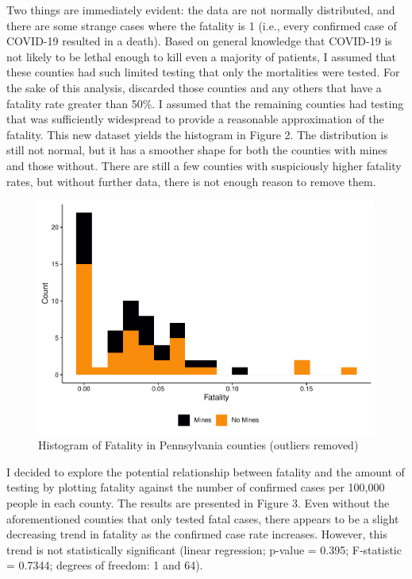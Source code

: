 \documentclass[
  12pt,
]{article}
\begin{document}
Two things are immediately evident: the data are not normally
distributed, and there are some strange cases where the fatality is 1
(i.e., every confirmed case of COVID-19 resulted in a death). Based on
general knowledge that COVID-19 is not likely to be lethal enough to
kill even a majority of patients, I assumed that these counties had such
limited testing that only the mortalities were tested. For the sake of
this analysis, discarded those counties and any others that have a
fatality rate greater than 50\%. I assumed that the remaining counties
had testing that was sufficiently widespread to provide a reasonable
approximation of the fatality. This new dataset yields the histogram in
Figure 2. The distribution is still not normal, but it has a smoother
shape for both the counties with mines and those without. There are
still a few counties with suspiciously higher fatality rates, but
without further data, there is not enough reason to remove them.

\begin{figure}
\centering
\includegraphics{Hancock_ENV872_Project_files/figure-latex/PA Histogram2-1.pdf}
\caption{Histogram of Fatality in Pennsylvania counties (outliers
removed)}
\end{figure}

I decided to explore the potential relationship between fatality and the
amount of testing by plotting fatality against the number of confirmed
cases per 100,000 people in each county. The results are presented in
Figure 3. Even without the aforementioned counties that only tested
fatal cases, there appears to be a slight decreasing trend in fatality
as the confirmed case rate increases. However, this trend is not
statistically significant (linear regression; p-value = 0.395;
F-statistic = 0.7344; degrees of freedom: 1 and 64).
\end{document}
